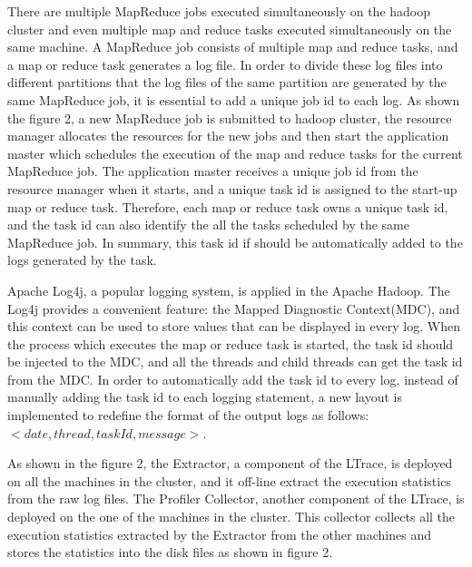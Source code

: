 There are multiple MapReduce jobs executed simultaneously on the hadoop cluster and even multiple map and reduce tasks executed simultaneously on the same machine. A MapReduce job consists of multiple map and reduce tasks, and a map or reduce task generates a log file. In order to divide these log files into different partitions that the log files of the same partition are generated by the same MapReduce job, it is essential to add a unique job id to each log. As shown the figure 2, a new MapReduce job is submitted to hadoop cluster, the resource manager allocates the resources for the new jobs  and then start the application master which schedules the execution of the map and reduce tasks for the current MapReduce job. The application master receives a unique job id from the resource manager when it starts, and a unique task id is assigned to the start-up map or reduce task. Therefore, each map or reduce task owns a unique task id, and the task id can also identify the all the tasks scheduled by the same MapReduce job. In summary, this task id if should be automatically added to the logs generated by the task.

Apache Log4j, a popular logging system, is applied in the Apache Hadoop. The Log4j provides a convenient feature: the Mapped Diagnostic Context(MDC), and this context can be used to store values that can be displayed in every log. When the process which executes the map or reduce task is started, the task id should be injected to the MDC, and all the threads and child threads can get the task id from the MDC. In order to automatically add the task id to every log, instead of manually adding the task id to each logging statement, a new layout is implemented to redefine the format of the output logs as follows: $<date, thread, taskId, message>$.

As shown in the figure 2, the Extractor, a component of the LTrace, is deployed on all the machines in the cluster, and it off-line extract the execution statistics from the raw log files. The Profiler Collector, another component of the LTrace, is deployed on the one of the machines in the cluster. This collector collects all the execution statistics extracted by the Extractor from the other machines and stores the statistics into the disk files as shown in figure 2.
